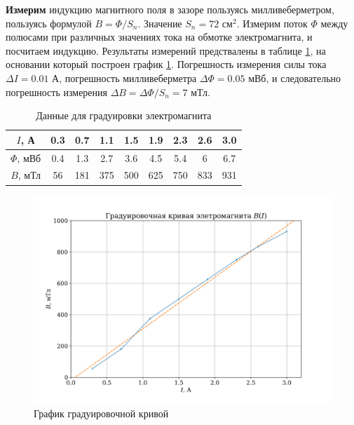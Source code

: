 \documentclass[a4paper,12pt]{article} %
\begin{document}
\textbf{Измерим} индукцию магнитного поля в зазоре пользуясь милливеберметром, пользуясь 
формулой $B = \Phi / S_n$. Значение $S_n = 72$ см$^2$. Измерим поток $\Phi$ между полюсами
при различных значениях тока на обмотке электромагнита, и посчитаем индукцию. Результаты измерений предствалены в таблице \ref{tab:grad}, на основании который построен график \ref{fig:grad_plot}. Погрешность измерения силы тока $\Delta I = 0.01$ А, погрешность милливеберметра $\Delta \Phi = 0.05$ мВб, и следовательно погрешность измерения $\Delta B = \Delta \Phi / S_n = 7$ мТл.

\begin{table}[h]
\begin{center}
\begin{tabular}{|c|c|c|c|c|c|c|c|c|}
\hline 
$I$, А & 0.3 & 0.7 & 1.1 & 1.5 & 1.9 & 2.3 & 2.6 & 3.0 \\ 
\hline 
$\Phi$, мВб & 0.4 & 1.3 & 2.7 & 3.6 & 4.5 & 5.4 & 6 & 6.7 \\ 
\hline 
$B$, мТл & 56 & 181 & 375 & 500 & 625 & 750 & 833 & 931 \\ 
\hline 
\end{tabular}
\caption{Данные для градуировки электромагнита} 
\label{tab:grad}
\end{center}
\end{table}

\begin{figure}[h]
\begin{center}
\includegraphics[width=\linewidth]{grad_plot.png}
\caption{График градуировочной кривой}
\label{fig:grad_plot}
\end{center}
\end{figure}
\end{document}
